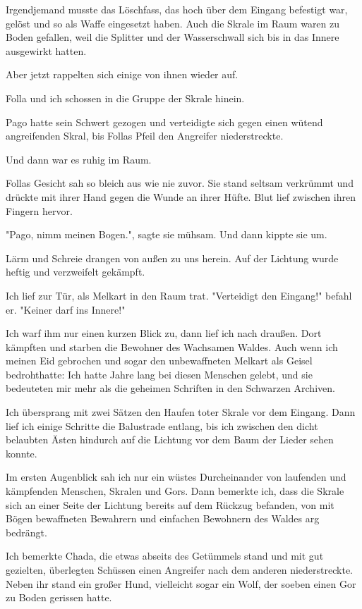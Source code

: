 \documentclass[10pt, a4paper, oneside]{book}
\begin{document}
\begin{multicols}{2}
Irgendjemand musste das Löschfass, das hoch über dem Eingang befestigt war, gelöst und so als Waffe eingesetzt haben. Auch die Skrale im Raum waren zu Boden gefallen, weil die Splitter und der Wasserschwall sich bis in das Innere ausgewirkt hatten.

Aber jetzt rappelten sich einige von ihnen wieder auf.

Folla und ich schossen in die Gruppe der Skrale hinein.

Pago hatte sein Schwert gezogen und verteidigte sich gegen einen wütend angreifenden Skral, bis Follas Pfeil den Angreifer niederstreckte.

Und dann war es ruhig im Raum.

Follas Gesicht sah so bleich aus wie nie zuvor. Sie stand seltsam verkrümmt und drückte mit ihrer Hand gegen die Wunde an ihrer Hüfte. Blut lief zwischen ihren Fingern hervor.

"Pago, nimm meinen Bogen.", sagte sie mühsam. Und dann kippte sie um.

Lärm und Schreie drangen von außen zu uns herein. Auf der Lichtung wurde heftig und verzweifelt gekämpft.

Ich lief zur Tür, als Melkart in den Raum trat. "Verteidigt den Eingang!" befahl er. "Keiner darf ins Innere!"

Ich warf ihm nur einen kurzen Blick zu, dann lief ich nach draußen. Dort kämpften und starben die Bewohner des Wachsamen Waldes. Auch wenn ich meinen Eid gebrochen und sogar den unbewaffneten Melkart als Geisel bedrohthatte: Ich hatte Jahre lang bei diesen Menschen gelebt, und sie bedeuteten mir mehr als die geheimen Schriften in den Schwarzen Archiven.

Ich übersprang mit zwei Sätzen den Haufen toter Skrale vor dem Eingang. Dann lief ich einige Schritte die Balustrade entlang, bis ich zwischen den dicht belaubten Ästen hindurch auf die Lichtung vor dem Baum der Lieder sehen konnte.

Im ersten Augenblick sah ich nur ein wüstes Durcheinander von laufenden und kämpfenden Menschen, Skralen und Gors. Dann bemerkte ich, dass die Skrale sich an einer Seite der Lichtung bereits auf dem Rückzug befanden, von mit Bögen bewaffneten Bewahrern und einfachen Bewohnern des Waldes arg bedrängt.

Ich bemerkte Chada, die etwas abseits des Getümmels stand und mit gut gezielten, überlegten Schüssen einen Angreifer nach dem anderen niederstreckte. Neben ihr stand ein großer Hund, vielleicht sogar ein Wolf, der soeben einen Gor zu Boden gerissen hatte.


\end{multicols}
\end{document}
